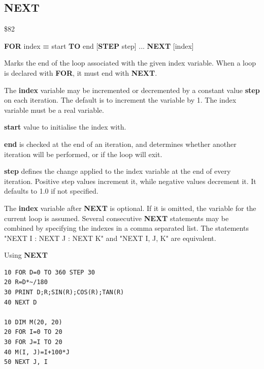 \subsection{NEXT}
\begin{description}[leftmargin=2cm,style=nextline]
\item [Token:]    \$82

\item [Format:]   {\bf FOR} index {\bf =} start {\bf TO} end [{\bf STEP} step] ... {\bf NEXT} [index]

\item [Usage:]    Marks the end of the loop associated with the given index variable. When a loop is declared with {\bf FOR}, it must end with {\bf NEXT}.

                  The {\bf index} variable may be incremented or decremented by a constant value {\bf step} on each iteration. The default is to increment the variable by 1. The index variable must be a real variable.

                  {\bf start} value to initialise the index with.

                  {\bf end} is checked at the end of an iteration, and determines whether another iteration will be performed, or if the loop will exit.

                  {\bf step} defines the change applied to the index variable at the end of every iteration. Positive step values increment it, while negative values decrement it. It defaults to 1.0 if not specified.

\item [Remarks:]  The {\bf index} variable after {\bf NEXT} is optional. If it is omitted, the variable for the current loop is assumed. Several consecutive {\bf NEXT} statements may be combined by specifying the indexes in a comma separated list. The statements "NEXT I : NEXT J : NEXT K" and "NEXT I, J, K" are equivalent.

\item [Examples:] Using {\bf NEXT}

\begin{tcolorbox}[colback=black,coltext=white]
\verbatimfont{\codefont}
\begin{verbatim}
10 FOR D=0 TO 360 STEP 30
20 R=D*~/180
30 PRINT D;R;SIN(R);COS(R);TAN(R)
40 NEXT D

10 DIM M(20, 20)
20 FOR I=0 TO 20
30 FOR J=I TO 20
40 M(I, J)=I+100*J
50 NEXT J, I
\end{verbatim}
\end{tcolorbox}
\end{description}

